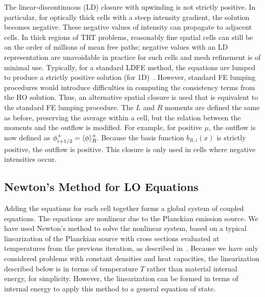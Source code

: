 The linear-discontinuous (LD) closure with upwinding is not strictly positive.  In particular, for
optically thick cells with a steep intensity gradient, the solution becomes negative.
These negative values of intensity can propagate to adjacent cells. In thick regions of
TRT problems, reasonably fine spatial cells can still be on the order of millions of mean
free paths; negative values with an LD representation are unavoidable in practice for
such cells and mesh refinement is of minimal use.  Typically, for a standard LDFE method,
the equations are lumped to produce a strictly positive solution (for 1D)~\cite{morel_newton}. However, standard FE lumping
procedures would introduce difficulties in computing the consistency terms from the
HO solution.  Thus, an alternative spatial closure is used that is equivalent to the
standard FE lumping procedure.  The $L$ and $R$ moments are defined the same as before,
preserving the average within a cell, but the relation between the moments and
the outflow is modified.   For example, for positive $\mu$,
the outflow is now defined as $\phi^+_{i+1/2} = \langle \phi \rangle_R^+.$  Because the basis function $b_{R,i}(x)$ is strictly
positive, the outflow is positive.  This closure is only used
in cells where negative intensities occur.

\subsection{Newton's Method for LO Equations}

Adding the equations for each cell together forms a global system of coupled equations.
The equations are nonlinear due to the Planckian emission source.  
We have used Newton's method to solve the nonlinear system, based on a typical linearization of the Planckian source with cross
sections evaluated at temperatures from the previous iteration, as described in~\cite{morel_newton}.  
Because we have only considered problems with constant densities and heat capacities, the
linearization described below is in terms of temperature $T$ rather than material internal
energy, for simplicity. However, the linearization can be formed in terms of internal energy
to apply this method to a general equation of state.

